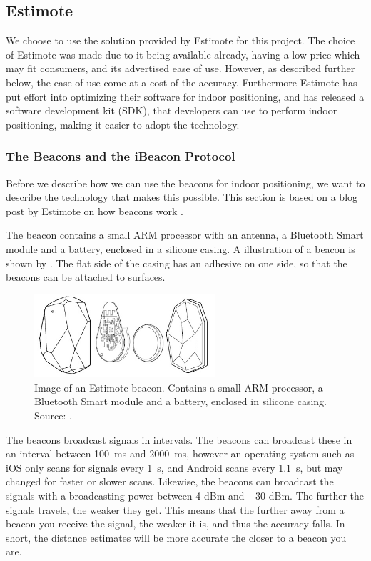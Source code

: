 \subsection{Estimote}
\label{sec:indoor-positioning:estimote}
We choose to use the solution provided by Estimote for this project.
The choice of Estimote was made due to it being available already, 
having a low price which may fit consumers, 
and its advertised ease of use. 
However, as described further below, the ease of use come at a cost of the accuracy.
Furthermore Estimote has put effort into optimizing their software for indoor positioning, 
and has released a software development kit (SDK),
that developers can use to perform indoor positioning, 
making it easier to adopt the technology.

\subsubsection{The Beacons and the iBeacon Protocol}
Before we describe how we can use the beacons for indoor positioning, 
we want to describe the technology that makes this possible. 
This section is based on a blog post by Estimote on how beacons work \cite{ESTIMOTEBEACON}.

The beacon contains a small ARM processor with an antenna, 
a Bluetooth Smart module and a battery, enclosed in a silicone casing.
A illustration of a beacon is shown by .
The flat side of the casing has an adhesive on one side, 
so that the beacons can be attached to surfaces. 

\begin{figure}[!htb]
  \centering
  \includegraphics[width=0.6\textwidth]{images/estimotebeacon}
  \caption{Image of an Estimote beacon. Contains a small ARM processor, a Bluetooth Smart module and a battery, enclosed in silicone casing. Source: \protect\cite{ESTIMOTEBEACON}.}
  \label{fig:estimotebeacon}
\end{figure}

The beacons broadcast signals in intervals. 
The beacons can broadcast these in an interval between \SI{100}{\milli\second} and \SI{2000}{\milli\second},
however an operating system such as iOS only scans for signals every \SI{1}{\second}, 
and Android scans every \SI{1.1}{\second}, 
but may changed for faster or slower scans.
Likewise, the beacons can broadcast the signals with a broadcasting power between \num{4} dBm and \num{-30} dBm.
The further the signals travels, the weaker they get.
This means that the further away from a beacon you receive the signal, 
the weaker it is, and thus the accuracy falls. 
In short, the distance estimates will be more accurate the closer to a beacon you are. 

